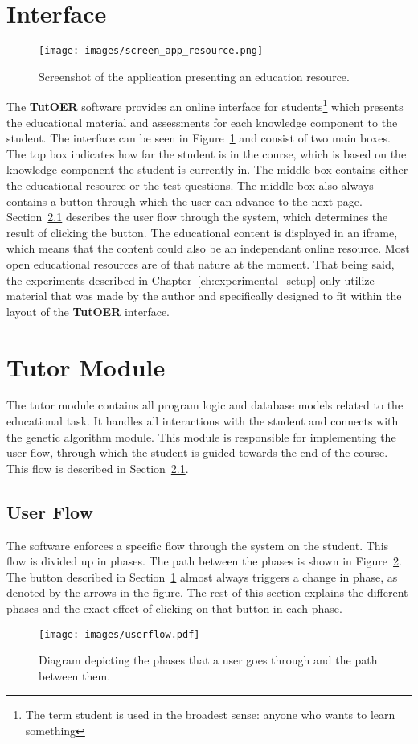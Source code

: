 \section{Interface}
\label{sec:software_interface}
\begin{figure}[ht!]
	\centering
	\texttt{[image: images/screen\_app\_resource.png]}
	\caption[Application screenshot - Resource]{Screenshot of the application
	presenting an education resource.}
	\label{fig:screen_app_resource}
\end{figure}
The \textbf{TutOER} software provides an online interface for
students\footnote{The term student is used in the broadest sense: anyone who
wants to learn something} which presents the educational material and
assessments for each knowledge component to the student. The interface can be
seen in Figure~\ref{fig:screen_app_resource} and consist of two main boxes. The
top box indicates how far the student is in the course, which is based on
the knowledge component the student is currently in. The middle box contains
either the educational resource or the test questions.
The middle box also always contains a button through which the user can advance
to the next page. Section~\ref{sec:software_user_flow} describes the user flow
through the system, which determines the result of clicking the button. The
educational content is displayed in an iframe, which means that the content
could also be an independant online resource. Most open educational resources
are of that nature at the moment. That being said, the experiments described in
Chapter~\ref{ch:experimental_setup} only utilize material that was made by the
author and specifically designed to fit within the layout of the \textbf{TutOER}
interface.
\section{Tutor Module}
\label{sec:software_tutor_module}
The tutor module contains all program logic and database models related to the
educational task. It handles all interactions with the student and connects
with the genetic algorithm module. This module is responsible for implementing
the user flow, through which the student is guided towards the end of the
course. This flow is described in Section~\ref{sec:software_user_flow}.
\subsection{User Flow}
\label{sec:software_user_flow}
The software enforces a specific flow through the system on the student. This
flow is divided up in phases. The path between the phases is shown in
Figure~\ref{fig:userflow}. The button described in
Section~\ref{sec:software_interface} almost always triggers a change in phase,
as denoted by the arrows in the figure. The rest of this section explains the
different phases and the exact effect of clicking on that button in each phase.
\begin{figure}[ht!]
	\centering
	\texttt{[image: images/userflow.pdf]}
	\caption[User flow diagram]{Diagram depicting the phases that a user goes
	through and the path between them.}
	\label{fig:userflow}
\end{figure}
